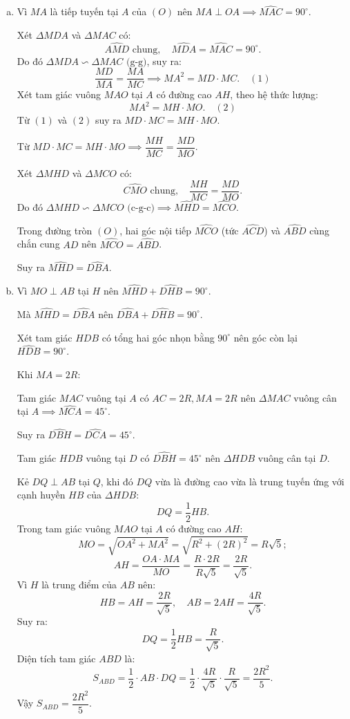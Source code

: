 \begin{bt}
{\begin{enumerate}[a)]
			Tứ giác $MDHA$ có $\widehat{ADM} = \widehat{MHA} = 90^\circ$, do đó hai đỉnh kề nhau $D$ và $H$ cùng nhìn đoạn $MA$ dưới góc vuông.
			
			Suy ra tứ giác $MDHA$ nội tiếp đường tròn đường kính $MA$.
			\item Vì $MA$ là tiếp tuyến tại $A$ của $(O)$ nên $MA \perp OA \implies \widehat{MAC} = 90^\circ$.
			
			Xét $\Delta MDA$ và $\Delta MAC$ có:
			$$\widehat{AMD}\text{ chung},\quad \widehat{MDA} = \widehat{MAC} = 90^\circ.$$
			Do đó $\Delta MDA \backsim \Delta MAC\text{ (g-g)}$, suy ra:
			$$\dfrac{MD}{MA} = \dfrac{MA}{MC} \implies MA^2 = MD \cdot MC. \quad (1)$$
			Xét tam giác vuông $MAO$ tại $A$ có đường cao $AH$, theo hệ thức lượng:
			$$MA^2 = MH \cdot MO. \quad (2)$$
			Từ $(1)$ và $(2)$ suy ra $MD \cdot MC = MH \cdot MO$.
			
			Từ $MD \cdot MC = MH \cdot MO \implies \dfrac{MH}{MC} = \dfrac{MD}{MO}$.
			
			Xét $\Delta MHD$ và $\Delta MCO$ có:
			$$\widehat{CMO}\text{ chung},\quad \dfrac{MH}{MC} = \dfrac{MD}{MO}.$$
			Do đó $\Delta MHD \backsim \Delta MCO\text{ (c-g-c)} \implies \widehat{MHD} = \widehat{MCO}$.
			
			Trong đường tròn $(O)$, hai góc nội tiếp $\widehat{MCO}$ (tức $\widehat{ACD}$) và $\widehat{ABD}$ cùng chắn cung $AD$ nên $\widehat{MCO} = \widehat{ABD}$.
			
			Suy ra $\widehat{MHD} = \widehat{DBA}$.
			\item Vì $MO \perp AB$ tại $H$ nên $\widehat{MHD} + \widehat{DHB} = 90^\circ$.
			
			Mà $\widehat{MHD} = \widehat{DBA}$ nên $\widehat{DBA} + \widehat{DHB} = 90^\circ$.
			
			Xét tam giác $HDB$ có tổng hai góc nhọn bằng $90^\circ$ nên góc còn lại $\widehat{HDB} = 90^\circ$.
			
			Khi $MA = 2R$:
			
			Tam giác $MAC$ vuông tại $A$ có $AC = 2R, MA = 2R$ nên $\Delta MAC$ vuông cân tại $A \implies \widehat{MCA} = 45^\circ$.
			
			Suy ra $\widehat{DBH} = \widehat{DCA} = 45^\circ$.
			
			Tam giác $HDB$ vuông tại $D$ có $\widehat{DBH} = 45^\circ$ nên $\Delta HDB$ vuông cân tại $D$.
			
			Kẻ $DQ \perp AB$ tại $Q$, khi đó $DQ$ vừa là đường cao vừa là trung tuyến ứng với cạnh huyền $HB$ của $\Delta HDB$:
			$$DQ = \dfrac{1}{2}HB.$$
			Trong tam giác vuông $MAO$ tại $A$ có đường cao $AH$:
			$$MO = \sqrt{OA^2 + MA^2} = \sqrt{R^2 + (2R)^2} = R\sqrt{5};$$
			$$AH = \dfrac{OA \cdot MA}{MO} = \dfrac{R \cdot 2R}{R\sqrt{5}} = \dfrac{2R}{\sqrt{5}}.$$
			Vì $H$ là trung điểm của $AB$ nên:
			$$HB = AH = \dfrac{2R}{\sqrt{5}},\quad AB = 2AH = \dfrac{4R}{\sqrt{5}}.$$
			Suy ra:
			$$DQ = \dfrac{1}{2}HB = \dfrac{R}{\sqrt{5}}.$$
			Diện tích tam giác $ABD$ là:
			$$S_{ABD} = \dfrac{1}{2} \cdot AB \cdot DQ = \dfrac{1}{2} \cdot \dfrac{4R}{\sqrt{5}} \cdot \dfrac{R}{\sqrt{5}} = \dfrac{2R^2}{5}.$$
			Vậy $S_{ABD} = \dfrac{2R^2}{5}$.
		\end{enumerate}
}
\end{bt}


